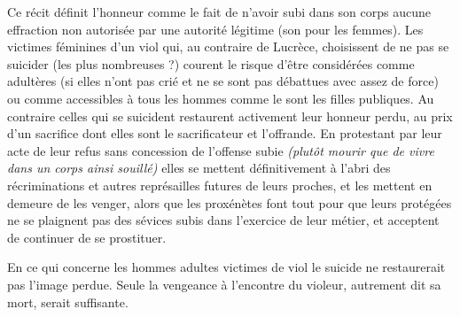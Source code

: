  Ce récit définit l'honneur comme le fait de n'avoir subi dans son corps aucune effraction non autorisée par une autorité légitime (son  pour les femmes). Les victimes féminines d'un viol qui, au contraire de Lucrèce, choisissent de ne pas se suicider (les plus nombreuses ?) courent le risque d'être considérées comme adultères (si elles n'ont pas crié et ne se sont pas débattues avec assez de force) ou comme accessibles à tous les hommes comme le sont les filles publiques. Au contraire celles qui se suicident restaurent activement leur honneur perdu, au prix d'un sacrifice dont elles sont le sacrificateur et l'offrande. En protestant par leur acte de leur refus sans concession de l'offense subie {\emph{(plutôt mourir que de vivre dans un corps ainsi souillé)}} elles se mettent définitivement à l'abri des récriminations et autres représailles futures de leurs proches, et les mettent en demeure de les venger, alors que les proxénètes font tout pour que leurs protégées ne se plaignent pas des sévices subis dans l'exercice de leur métier, et acceptent de continuer de se prostituer. 
 
En ce qui concerne les hommes adultes victimes de viol le suicide ne restaurerait pas l'image perdue. Seule la vengeance à l'encontre du violeur, autrement dit sa mort, serait suffisante. 


